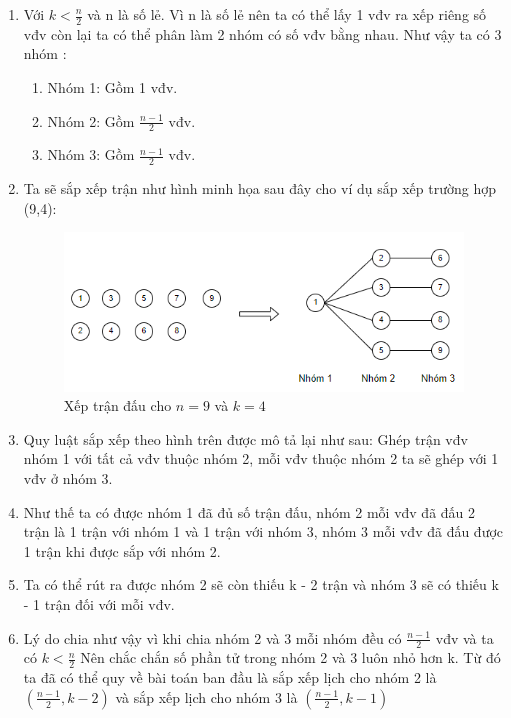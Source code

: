 \documentclass[13pt,a4paper]{article}
\begin{document}
\begin{enumerate}
	 \newpage
	 \item Với $k < \frac{n}{2}$ và n là số lẻ. Vì n là số lẻ nên ta có thể lấy 1 vđv ra xếp riêng số vđv còn lại ta có thể phân làm 2 nhóm có số vđv bằng nhau. Như vậy ta có 3 nhóm : 
	 \begin{enumerate}
	 	\item Nhóm 1: Gồm 1 vđv.
	 	\item Nhóm 2: Gồm $\frac{n-1}{2} $ vđv.
	 	\item Nhóm 3: Gồm $\frac{n-1}{2} $ vđv.
	 \end{enumerate}
	 \item[] Ta sẽ sắp xếp trận như hình minh họa sau đây cho ví dụ sắp xếp trường hợp (9,4):
	 \begin{figure}[H]
	 	\centering
	 	\includegraphics[scale=0.7]{./image/kle.png}
	 	\caption{Xếp trận đấu cho $n = 9$ và $k = 4$}
	 \end{figure}
	 \item[] Quy luật sắp xếp theo hình trên được mô tả lại như sau: Ghép trận vđv nhóm 1 với tất cả vđv thuộc nhóm 2, mỗi vđv thuộc nhóm 2 ta sẽ ghép với 1 vđv ở nhóm 3.
	 \item[] Như thế ta có được nhóm 1 đã đủ số trận đấu, nhóm 2 mỗi vđv đã đấu 2 trận là 1 trận với nhóm 1 và 1 trận với nhóm 3, nhóm 3 mỗi vđv đã đấu được 1 trận khi được sắp với nhóm 2.
	 \item[] Ta có thể rút ra được nhóm 2 sẽ còn thiếu k - 2 trận và nhóm 3 sẽ có thiếu k - 1 trận đối với mỗi vđv.
	 \item[] Lý do chia như vậy vì khi chia nhóm 2 và 3 mỗi nhóm đều có $\frac{n-1}{2}$ vđv và ta có $k < \frac{n}{2}$ Nên chắc chắn số phần tử trong nhóm 2 và 3 luôn nhỏ hơn k. Từ đó ta đã có thể quy về bài toán ban đầu là sắp xếp lịch cho nhóm 2 là $(\frac{n-1}{2} , k - 2)$ và sắp xếp lịch cho nhóm 3 là $(\frac{n-1}{2} , k - 1)$ 
	 
\end{enumerate}
\end{document}
